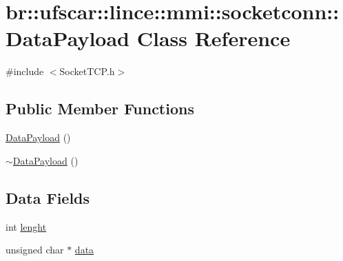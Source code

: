 \hypertarget{classbr_1_1ufscar_1_1lince_1_1mmi_1_1socketconn_1_1DataPayload}{
\section{br::ufscar::lince::mmi::socketconn::DataPayload Class Reference}
\label{classbr_1_1ufscar_1_1lince_1_1mmi_1_1socketconn_1_1DataPayload}
}


{\ttfamily \#include $<$SocketTCP.h$>$}

\subsection*{Public Member Functions}
\begin{DoxyCompactItemize}
\item 
\hyperlink{classbr_1_1ufscar_1_1lince_1_1mmi_1_1socketconn_1_1DataPayload_a505286f74ce4de188aa2a4766039e59f}{DataPayload} ()
\item 
\hyperlink{classbr_1_1ufscar_1_1lince_1_1mmi_1_1socketconn_1_1DataPayload_aacb1558c005cdbb39a0f935c9767486c}{$\sim$DataPayload} ()
\end{DoxyCompactItemize}
\subsection*{Data Fields}
\begin{DoxyCompactItemize}
\item 
int \hyperlink{classbr_1_1ufscar_1_1lince_1_1mmi_1_1socketconn_1_1DataPayload_a8ad1decf0c882fe9b7037966f60bee2c}{lenght}
\item 
unsigned char $\ast$ \hyperlink{classbr_1_1ufscar_1_1lince_1_1mmi_1_1socketconn_1_1DataPayload_a3395f32c56fd47914fdf6771b507b43f}{data}
\end{DoxyCompactItemize}


